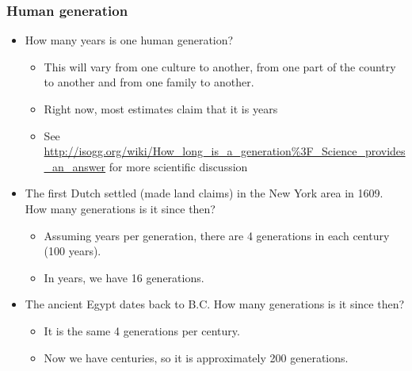 \documentclass[notheorems
          ]
          {beamer}
\begin{document}
\begin{frame}
 \frametitle {Human generation   } 
 
 \begin{itemize}
  \item How many years is one human generation?
   \begin{itemize}
    \item This will vary from one culture to another, from one part of the country to another
    and from one family to another. 
    \item Right now, most estimates claim that it is  years 
    \item See \url{http://isogg.org/wiki/How_long_is_a_generation\%3F_Science_provides_an_answer}
    for more scientific discussion 
   \end{itemize}
  \item The first Dutch settled (made land claims) in the New York area in 1609. How many generations 
  is it since then? 
  \begin{itemize}
   \item Assuming  years per generation, there are 4 generations in each century (100 years). 
   \item In  years, we have 16 generations. 
  \end{itemize}
  \item The ancient Egypt dates back to  B.C. How many generations is it since then? 
  \begin{itemize}
   \item It is the same 4 generations per century.
   \item Now we have  centuries, so it is approximately 200 generations. 
  \end{itemize}

 \end{itemize}

\end{frame}
\end{document}

